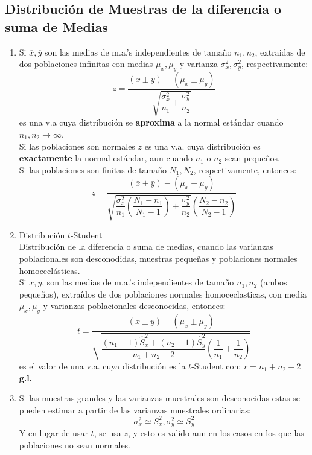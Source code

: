 \subsection{Distribución de Muestras de la diferencia o suma de Medias}
\begin{enumerate}[label=\textbf{(\Roman*)}]
\item Si $\overline{x},\overline{y}$ son las medias de m.a.'s independientes de tamaño $n_1,n_2$, extraidas de dos poblaciones infinitas con medias $\mu_x,\mu_y$ y varianza $\sigma_{x}^2,\sigma_{y}^2$, respectivamente:
$$z=\dfrac{(\bar{x}\pm\bar{y})-(\mu_x\pm\mu_y)}{\sqrt{\dfrac{\sigma_{x}^2}{n_1}+\dfrac{\sigma_{y}^2}{n_2}}}$$
es una v.a cuya distribución se \textbf{aproxima} a la normal estándar cuando $n_1,n_2\rightarrow\infty$. \\
Si las poblaciones son normales $z$ es una v.a. cuya distribución es \textbf{exactamente} la normal estándar, aun cuando $n_1$ o $n_2$ sean pequeños.\\Si las poblaciones son finitas de tamaño $N_1,N_2$, respectivamente, entonces:
$$z=\dfrac{(\bar{x}\pm\bar{y})-(\mu_x\pm\mu_y)}{\sqrt{\dfrac{\sigma_{x}^2}{n_1}\left(\dfrac{N_1-n_1}{N_1 - 1}\right)  +\dfrac{\sigma_{y}^2}{n_2}}\left(\dfrac{N_2-n_2}{N_2 - 1}\right)}  $$
\item Distribución $t$-Student \\${ }$\\
Distribución de la diferencia o suma de medias, cuando las varianzas poblacionales son desconodidas, muestras pequeñas y poblaciones normales homoceclásticas. \\
Si $\overline{x},\overline{y}$, son las medias de m.a.'s independientes de tamaño $n_1,n_2$ (ambos pequeños), extraídos de dos poblaciones normales homoceclasticas, con media $\mu_x,\mu_y$ y varianzas poblacionales desconocidas, entonces:
$$t=\dfrac{(\bar{x}\pm\bar{y})-(\mu_x\pm\mu_y)}{\sqrt{\dfrac{(n_1-1)\hat{S}_x^2+(n_2-1)\hat{S}_y^2}{n_1 + n_2 - 2}\left( \dfrac{1}{n_1}+\dfrac{1}{n_2} \right) }}$$
es el valor de una v.a. cuya distribución es la $t$-Student con:
$r = n_1 +n_2 -2$ \textbf{g.l.}
\item Si las muestras grandes y las varianzas muestrales son desconocidas estas se pueden estimar a partir de las varianzas muestrales ordinarias:
$$ \sigma_{x}^2 \simeq S_{x}^2 , \sigma_{y}^2 \simeq S_{y}^2$$
Y en lugar de usar $t$, se usa $z$, y esto es valido aun en los casos en los que las poblaciones no sean normales.
\end{enumerate}

